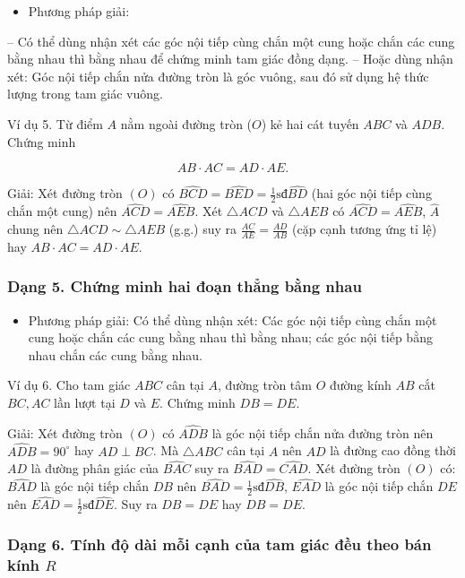 \documentclass[%
    fontsize=12pt,%
    chapterprefix=false,%
    open=right,%
    twoside=false,%
    numbers=noenddot,%
    headings=optiontohead,%
    final,%
    DIV=15,%
    parskip=half %
]{scrbook}
\begin{document}
\begin{itemize}
  \item Phương pháp giải:
\end{itemize}

-- Có thể dùng nhận xét các góc nội tiếp cùng chắn một cung hoặc chắn các cung bằng nhau thì bằng nhau để chứng minh tam giác đồng dạng. -- Hoặc dùng nhận xét: Góc nội tiếp chắn nửa đường tròn là góc vuông, sau đó sử dụng hệ thức lượng trong tam giác vuông.

Ví dụ 5. Từ điểm $A$ nằm ngoài đường tròn ($O$) kẻ hai cát tuyến $ABC$ và $ADB$. Chứng minh

\[
AB \cdot AC = AD \cdot AE.
\]


Giải: Xét đường tròn $(O)$ có $ \widehat{BCD} = \widehat{BED} = \frac{1}{2} \text{sđ}\widehat{BD} $ (hai góc nội tiếp cùng chắn một cung) nên $ \widehat{ACD} = \widehat{AEB} $. Xét $ \triangle ACD $ và $ \triangle AEB $ có $ \widehat{ACD} = \widehat{AEB} $, $ \widehat{A} $ chung nên $ \triangle ACD \sim \triangle AEB $ (g.g.) suy ra $ \frac{AC}{AE} = \frac{AD}{AB} $ (cặp cạnh tương ứng tỉ lệ) hay $ AB \cdot AC = AD \cdot AE $.
\subsubsection{Dạng 5. Chứng minh hai đoạn thẳng bằng nhau}

\begin{itemize}
  \item Phương pháp giải: Có thể dùng nhận xét: Các góc nội tiếp cùng chắn một cung hoặc chắn các cung bằng nhau thì bằng nhau; các góc nội tiếp bằng nhau chắn các cung bằng nhau.
\end{itemize}

Ví dụ 6. Cho tam giác $ ABC $ cân tại $ A $, đường tròn tâm $ O $ đường kính $ AB $ cắt $ BC, AC $ lần lượt tại $ D $ và $ E $. Chứng minh $ DB = DE $.

Giải: Xét đường tròn $(O)$ có $ \widehat{ADB} $ là góc nội tiếp chắn nửa đường tròn nên $ \widehat{ADB} = 90^\circ $ hay $ AD \perp BC $. Mà $ \triangle ABC $ cân tại $ A $ nên $ AD $ là đường cao đồng thời $ AD $ là đường phân giác của $ \widehat{BAC} $ suy ra $ \widehat{BAD} = \widehat{CAD} $. Xét đường tròn $(O)$ có: $ \widehat{BAD} $ là góc nội tiếp chắn $ DB $ nên $ \widehat{BAD} = \frac{1}{2} \text{sđ}\widehat{DB} $, $ \widehat{EAD} $ là góc nội tiếp chắn $ DE $ nên $ \widehat{EAD} = \frac{1}{2} \text{sđ}\widehat{DE} $. Suy ra $ DB = DE $ hay $ DB = DE $.
\subsubsection{Dạng 6. Tính độ dài mỗi cạnh của tam giác đều theo bán kính $ R $}
\end{document}
